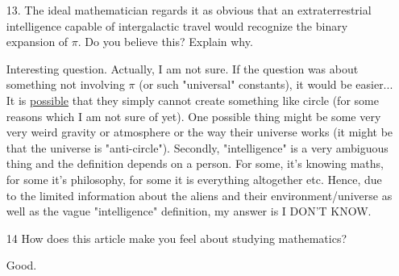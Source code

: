 \documentclass[12pt, a4paper]{article}                  %
\begin{document}
\begin{enumerate}
\item[13.]
The ideal mathematician regards it as obvious that an extraterrestrial intelligence
capable of intergalactic travel would recognize the binary expansion of $\pi$.
Do you believe this? Explain why.

Interesting question. Actually, I am not sure. If the question was about something not
involving $\pi$ (or such "universal" constants), it would be easier... It is \underline{possible} that they
simply cannot create something like circle (for some reasons which I am not sure of yet).
One possible thing might be some very very weird gravity or atmosphere or the way their
universe works (it might be that the universe is "anti-circle"). Secondly, "intelligence"
is a very ambiguous thing and the definition depends on a person. For some, it's knowing maths,
for some it's philosophy, for some it is everything altogether etc.
Hence, due to the limited information about the aliens and their environment/universe as well as
the vague "intelligence" definition, my answer is I DON'T KNOW.

\item[14]
How does this article make you feel about studying mathematics?

Good.
\end{enumerate}
\end{document}
